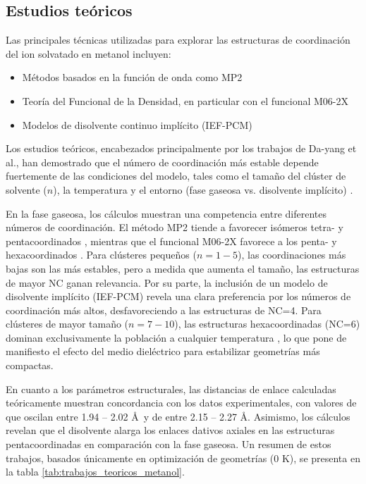 \subsection{Estudios teóricos}

Las principales técnicas utilizadas para explorar las estructuras de coordinación del ion  solvatado en metanol incluyen:
\begin{itemize}
    \item Métodos basados en la función de onda como MP2 
    \item Teoría del Funcional de la Densidad, en particular con el funcional M06-2X
    \item Modelos de disolvente continuo implícito (IEF-PCM)
\end{itemize}

Los estudios teóricos, encabezados principalmente por los trabajos de Da-yang et al., han demostrado que el número de coordinación más estable depende fuertemente de las condiciones del modelo, tales como el tamaño del clúster de solvente ($n$), la temperatura y el entorno (fase gaseosa vs. disolvente implícito) \cite{Me-2022-01, Me-2023-02}.

En la fase gaseosa, los cálculos muestran una competencia entre diferentes números de coordinación. El método MP2 tiende a favorecer isómeros tetra- y pentacoordinados \cite{Me-2022-01}, mientras que el funcional M06-2X favorece a los penta- y hexacoordinados \cite{Me-2023-01}. Para clústeres pequeños ($n=1-5$), las coordinaciones más bajas son las más estables, pero a medida que aumenta el tamaño, las estructuras de mayor NC ganan relevancia. Por su parte, la inclusión de un modelo de disolvente implícito (IEF-PCM) revela una clara preferencia por los números de coordinación más altos, desfavoreciendo a las estructuras de NC=4. Para clústeres de mayor tamaño ($n=7-10$), las estructuras hexacoordinadas (NC=6) dominan exclusivamente la población a cualquier temperatura \cite{Me-2023-02}, lo que pone de manifiesto el efecto del medio dieléctrico para estabilizar geometrías más compactas.

En cuanto a los parámetros estructurales, las distancias de enlace calculadas teóricamente muestran concordancia con los datos experimentales, con valores de  que oscilan entre 1.94 -- 2.02 \AA \ y de  entre 2.15 -- 2.27 \AA. Asimismo, los cálculos revelan que el disolvente alarga los enlaces dativos axiales en las estructuras pentacoordinadas en comparación con la fase gaseosa. Un resumen de estos trabajos, basados únicamente en optimización de geometrías (0 K), se presenta en la tabla \ref{tab:trabajos_teoricos_metanol}.

